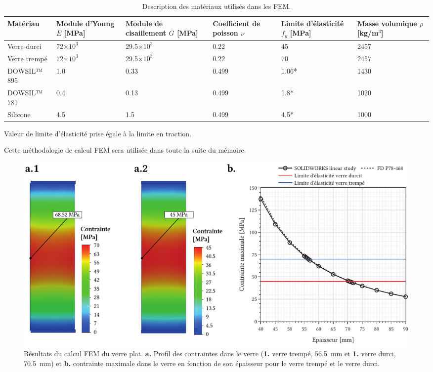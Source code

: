 \documentclass[11pt,titlepage]{article}
\begin{document}
\begin{table}[H]
\begin{center}
\caption{Description des matériaux utilisés dans les \acrshort{FEM}.}
\label{tab:mat_autoportant}
\begin{tabularx}{\textwidth}{l*{5}{Y}}
\toprule
\textbf{Matériau} & \textbf{Module d'Young} $E$ [MPa] & \textbf{Module de cisaillement} $G$ [MPa]&\textbf{Coefficient de poisson} $\nu$ & \textbf{Limite d'élasticité} $f_y$ [MPa]& \textbf{Masse volumique} $\rho$ [kg/m$^3$] \\\midrule
Verre durci & 72$\times 10^3$ & 29.5$\times 10^3$ & 0.22 &45 & 2457 \\
Verre trempé & 72$\times 10^3$ & 29.5$\times 10^3$ & 0.22 &70 & 2457 \\
DOWSIL™ 895 & 1.0 & 0.33 & 0.499 & 1.06* & 1430 \\
DOWSIL™ 781 & 0.4 & 0.13 & 0.499 & 1.8* & 1020 \\
Silicone & 4.5 & 1.5 & 0.499 & 4.5* & 1000\\
\bottomrule
\end{tabularx}
\end{center}
{\RaggedLeft \footnotesize * Valeur de limite d'élasticité prise égale à la limite en traction.}\end{table}

Cette méthodologie de calcul \acrshort{FEM} sera utilisée dans toute la suite du mémoire.

\begin{figure}[H]
    \centering
    \includegraphics[width=\textwidth]{img/plat/dim_fem.pdf}
    \caption{Résultats du calcul \acrshort{FEM} du verre plat. \textbf{a.} Profil des contraintes dans le verre (\textbf{1.} verre trempé, \qty{56.5}{\milli\meter} et \textbf{1.} verre durci, \qty{70.5}{\milli\meter}) et \textbf{b.} contrainte maximale dans le verre en fonction de son épaisseur pour le verre trempé et le verre durci.}
    \label{fig:fem_plat_dim}
\end{figure}
\end{document}
